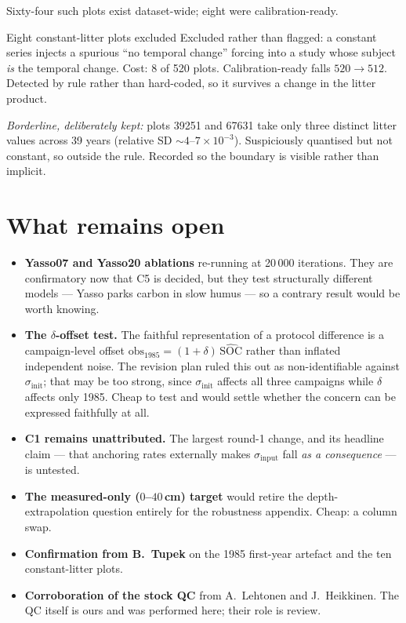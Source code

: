 \documentclass[11pt]{article}
\newcommand{\sinit}{\sigma_{\mathrm{init}}}
\newcommand{\sinput}{\sigma_{\mathrm{input}}}
\begin{document}
Sixty-four such plots exist dataset-wide; eight were calibration-ready.

\begin{decision}{Eight constant-litter plots excluded}
Excluded rather than flagged: a constant series injects a spurious ``no temporal change''
forcing into a study whose subject \emph{is} the temporal change. Cost: 8 of 520 plots.
Calibration-ready falls $520 \rightarrow 512$. Detected by rule rather than hard-coded, so it
survives a change in the litter product.

\smallskip
\emph{Borderline, deliberately kept:} plots 39251 and 67631 take only three distinct litter
values across 39 years (relative SD $\sim\!4$--$7\times10^{-3}$). Suspiciously quantised but
not constant, so outside the rule. Recorded so the boundary is visible rather than implicit.
\end{decision}

\section{What remains open}

\begin{itemize}\setlength{\itemsep}{2pt}
\item \textbf{Yasso07 and Yasso20 ablations} re-running at 20\,000 iterations. They are
  confirmatory now that C5 is decided, but they test structurally different models --- Yasso
  parks carbon in slow humus --- so a contrary result would be worth knowing.
\item \textbf{The $\delta$-offset test.} The faithful representation of a protocol difference is
  a campaign-level offset $\mathrm{obs}_{1985} = (1+\delta)\,\widehat{\mathrm{SOC}}$ rather than
  inflated independent noise. The revision plan ruled this out as non-identifiable against
  $\sinit$; that may be too strong, since $\sinit$ affects all three campaigns while $\delta$
  affects only 1985. Cheap to test and would settle whether the concern can be expressed
  faithfully at all.
\item \textbf{C1 remains unattributed.} The largest round-1 change, and its headline claim ---
  that anchoring rates externally makes $\sinput$ fall \emph{as a consequence} --- is untested.
\item \textbf{The measured-only ($0$--$40$\,cm) target} would retire the depth-extrapolation
  question entirely for the robustness appendix. Cheap: a column swap.
\item \textbf{Confirmation from B.~Tupek} on the 1985 first-year artefact and the ten
  constant-litter plots.
\item \textbf{Corroboration of the stock QC} from A.~Lehtonen and J.~Heikkinen. The QC itself is
  ours and was performed here; their role is review.
\end{itemize}
\end{document}
